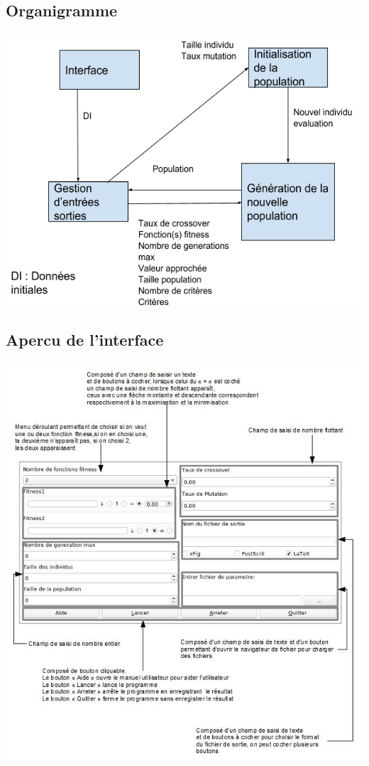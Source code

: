\documentclass[a4paper,11pt]{article}
\begin{document}
		\subsection{Organigramme}
		\centerline{\includegraphics{OrganigrammeV9.png}}
		
		\subsection{Apercu de l'interface}
		\centerline{\includegraphics{InterfaceExpliquer.png}}
	
\end{document}
